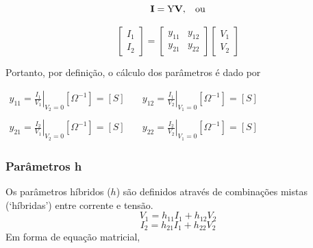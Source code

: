 \documentclass{article}
\numberwithin{equation}{section}
\begin{document}
    \begin{equation*}
        \textbf{I}=\text{Y}\textbf{V}, \hspace{0.3cm} \text{ou}
    \end{equation*}

    \begin{equation}
        \begin{bmatrix}
            I_{1} \\
            I_{2}
        \end{bmatrix}
        = %
        \begin{bmatrix}
            y_{11} & y_{12} \\
            y_{21} & y_{22}
        \end{bmatrix}
        \begin{bmatrix}
            V_{1} \\
            V_{2}
        \end{bmatrix}
    \end{equation}

    Portanto, por definição, o cálculo dos parâmetros é dado por
    \begin{center}
        $\begin{matrix} %
                y_{11}=\displaystyle\left.\frac{I_{1}}{V_{1}}\right|_{V_{2}=0} [\Omega^{-1}]=[S] &\quad y_{12}=\displaystyle\left.\frac{I_{1}}{V_{2}}\right|_{V_{1}=0} [\Omega^{-1}]=[S]\\ \\
                y_{21}=\displaystyle\left.\frac{I_{2}}{V_{1}}\right|_{V_{2}=0} [\Omega^{-1}]=[S] &\quad y_{22}=\displaystyle\left.\frac{I_{2}}{V_{2}}\right|_{V_{1}=0} [\Omega^{-1}]=[S]
        \end{matrix}$
    \end{center}


    \subsubsection{Parâmetros h}
    \label{subsubsec:quadripolosh}
    Os parâmetros híbridos ($h$) são definidos através de combinações mistas (`híbridas') entre corrente e tensão.
    \begin{equation*}
        V_{1}=h_{11}I_{1}+h_{12}V_{2}
    \end{equation*}
    \begin{equation*}
        I_{2}=h_{21}I_{1}+h_{22}V_{2}
    \end{equation*}
    Em forma de equação matricial,
\end{document}
